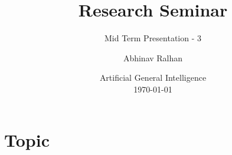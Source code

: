 \documentclass[
	11pt, %
]{beamer}
\title[Research Seminar]{Research Seminar} %
\subtitle{Mid Term Presentation - 3} %
\author[Abhinav Ralhan]{Abhinav Ralhan} %
\institute[UniKo]{University of Koblenz \\ \smallskip \textit{abhinavr8@uni-koblenz.de}} %
\date[\today]{Artificial General Intelligence \\ \today} %
\begin{document}

\begin{frame}
	\titlepage %
\end{frame}

\section{Topic} %
\end{document}
